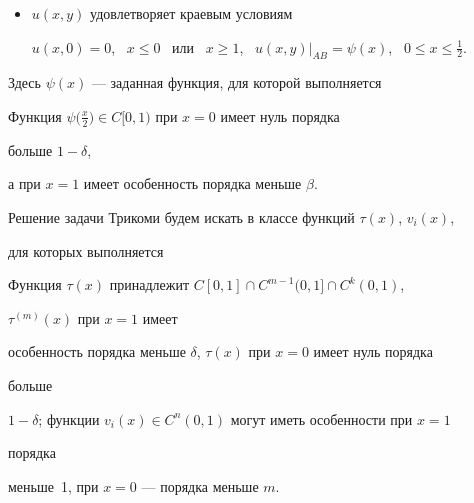 {\begin{itemize}
\begin{equation}
\end{equation} 


$A^j_{p,q}(x,y,\tau)=\sum\limits^m_{l=1} \frac{a^j_l}{l!} 


\tau^{(l)}(x)y^l$, $a^1_l=l_1(-1)^l\int\limits^\pi_0 e^{2q\xi} \cos^l 


\xi\sin^{-2p-l}\xi\,d\xi$, $l_1=B(1-p-iq,\;1-p+iq)/4^p \pi e^{\pi q}$, $B$ 


--- бета-функция, $c>0$ --- параметр, 


$a^2_l=F(-l,\beta,\beta+\beta',2)$, $F$ --- гипергеометрическая функция 


Гаусса\/$;$ 


\item[4)] $u(x,y)$ удовлетворяет краевым условиям 


\begin{center}


$u(x,0)=0$, \ $x\le0$ \ или \ $x\ge1$, \ $u(x,y)|_{AB}=\psi(x)$, \ $0\le 


x\le\frac{1}{2}$. 


\end{center}


\end{itemize} 


} 


 


\noindent{}Здесь $\psi(x)$ --- заданная функция, для которой выполняется 


 


\begin{cond} 


Функция $\psi\big(\frac{x}{2}\big)\in C[0,1)$ при $x=0$ имеет нуль порядка 


больше $1-\delta$, 


а при $x=1$ имеет особенность порядка меньше $\beta$. 


\end{cond} 


 


 


Решение задачи Трикоми будем искать в классе функций $\tau(x)$, $v_i(x)$, 


для которых выполняется 


 


\begin{cond} 


Функция $\tau(x)$ принадлежит $C[0,1]\cap C^{m-1}(0,1]\cap C^k(0,1)$,


$\tau^{(m)}(x)$ при $x=1$ имеет 


особенность порядка меньше $\delta$, $\tau(x)$ при $x=0$ имеет нуль порядка 


больше 


$1-\delta$; функции $v_i(x)\in C^n(0,1)$ могут иметь особенности при $x=1$ 


порядка 


меньше~1, при $x=0$ --- порядка меньше $m$. 


\end{cond} 


